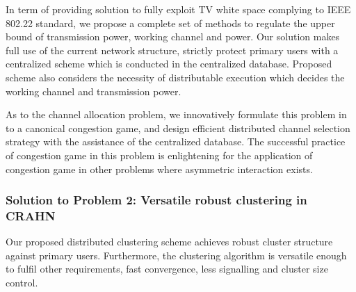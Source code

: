 
In term of providing solution to fully exploit TV white space complying to IEEE 802.22 standard, we propose a complete set of methods to regulate the upper bound of transmission power, working channel and power.
Our solution makes full use of the current network structure, strictly protect primary users with a centralized scheme which is conducted in the centralized database.
Proposed scheme also considers the necessity of distributable execution which decides the working channel and transmission power.

As to the channel allocation problem, we innovatively formulate this problem in to a canonical congestion game, and design efficient distributed channel selection strategy with the assistance of the centralized database.
The successful practice of congestion game in this problem is enlightening for the application of congestion game in other problems where asymmetric interaction exists.







\subsubsection{Solution to Problem 2: Versatile robust clustering in CRAHN}
Our proposed distributed clustering scheme achieves robust cluster structure against primary users.
Furthermore, the clustering algorithm is versatile enough to fulfil other requirements, \ie fast convergence, less signalling and cluster size control.

